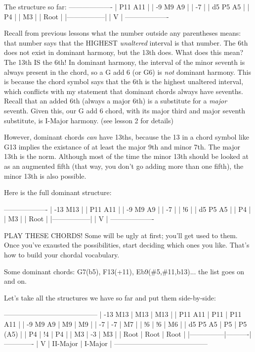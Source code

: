 The structure so far:
-------------------
|      P11  A11   |
| -9    M9   A9   |
|       -7        |
|  d5   P5   A5   |
|       P4        |
|       M3        |
|      Root       |
|-----------------|
|        V        |
-------------------

Recall from previous lessons what the number outside any parentheses means:
that number says that the HIGHEST \emph{unaltered} interval is that number. The
6th does not exist in dominant harmony, but the 13th does. What does this
mean? The 13th IS the 6th! In dominant harmony, the interval of the minor
seventh is always present in the chord, so a G add 6 (or G6) is \emph{not} dominant
harmony. This is because the chord symbol says that the 6th is the highest
unaltered interval, which conflicts with my statement that dominant chords
always have sevenths. Recall that an added 6th (always a major 6th) is a
substitute for a \emph{major} seventh. Given this, our G add 6 chord, with its
major third and major seventh substitute, is I-Major harmony. (see lesson
2 for details)

However, dominant chords \emph{can} have 13ths, because the 13 in a chord symbol
like G13 implies the existance of at least the major 9th and minor 7th.
The major 13th is the norm. Although most of the time the minor 13th should
be looked at as an augmented fifth (that way, you don't go adding more than
one fifth), the minor 13th is also possible.

Here is the full dominant structure:

-------------------
| -13  M13        |
|      P11  A11   |
| -9    M9   A9   |
|       -7        |
|       !6        |
|  d5   P5   A5   |
|       P4        |
|       M3        |
|      Root       |
|-----------------|
|        V        |
-------------------

PLAY THESE CHORDS! Some will be ugly at first; you'll get used to them. Once
you've exausted the possibilities, start deciding which ones you like. That's
how to build your chordal vocabulary.

Some dominant chords: G7(b5), F13(+11), Eb9(\#5,\#11,b13)... the list goes on and
on.

Let's take all the structures we have so far and put them side-by-side:

-----------------------------------------
| -13  M13      |   M13    |  M13       |
|      P11  A11 |   P11    |  P11  A11  |
|  -9   M9   A9 |    M9    |   M9       |
|       -7      |    -7    |   M7       |
|       !6      |    !6    |   M6       |
|  d5   P5   A5 |    P5    |   P5 (A5)  |
|       P4      |    !4    |   P4       |
|       M3      |    -3    |   M3       |
|      Root     |   Root   |  Root      |
|---------------|----------|-------------
|        V      | II-Major | I-Major    |
-----------------------------------------

